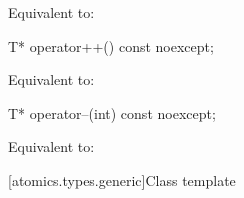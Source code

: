 \begin{itemdescr}
\pnum
\effects Equivalent to: 
\end{itemdescr}

%
%
\begin{itemdecl}
T* operator++() const noexcept;
\end{itemdecl}

\begin{itemdescr}
\pnum
\effects Equivalent to: 
\end{itemdescr}

%
%
\begin{itemdecl}
T* operator--(int) const noexcept;
\end{itemdecl}

\begin{itemdescr}
\pnum
\effects Equivalent to: 
\end{itemdescr}

[atomics.types.generic]{Class template }

